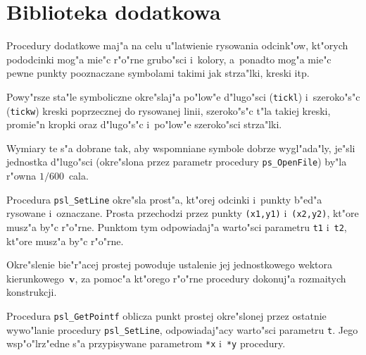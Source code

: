 \section{Biblioteka dodatkowa}

Procedury dodatkowe maj"a na celu u"latwienie rysowania odcink"ow, kt"orych
pod\-od\-cin\-ki mog"a mie"c r"o"rne grubo"sci i~kolory, a~ponadto mog"a mie"c
pewne punkty pooznaczane symbolami takimi jak strza"lki, kreski itp.

\vspace{\bigskipamount}
\begin{sloppypar}
Powy"rsze sta"le symboliczne okre"slaj"a po"low"e d"lugo"sci (\texttt{tickl})
i~szeroko"s"c (\texttt{tickw}) kreski poprzecznej do rysowanej linii,
szeroko"s"c t"la takiej kreski, promie"n kropki oraz d"lugo"s"c i~po"low"e
szeroko"sci strza"lki.
\end{sloppypar}

Wymiary te s"a dobrane tak, aby wspomniane symbole dobrze
wygl"ada"ly, je"sli jednostka d"lugo"sci (okre"slona przez parametr
procedury \texttt{ps\_OpenFile}) by"la r"owna $1/600$~cala.

\newpage
Procedura \texttt{psl\_SetLine} okre"sla prost"a, kt"orej odcinki i~punkty
b"ed"a rysowane i~oznaczane. Prosta przechodzi przez punkty \texttt{(x1,y1)}
i~\texttt{(x2,y2)}, kt"ore musz"a by"c r"o"rne. Punktom tym odpowiadaj"a
warto"sci parametru \texttt{t1} i~\texttt{t2}, kt"ore musz"a by"c r"o"rne.

Okre"slenie bie"r"acej prostej powoduje ustalenie jej jednostkowego wektora
kierunkowego~$\bm{v}$, za pomoc"a kt"orego r"o"rne procedury dokonuj"a
rozmaitych konstrukcji.

\vspace{\bigskipamount}
Procedura \texttt{psl\_GetPointf} oblicza punkt prostej okre"slonej przez
ostatnie wywo"lanie procedury \texttt{psl\_SetLine}, odpowiadaj"acy
warto"sci parametru \texttt{t}. Jego wsp"o"lrz"edne s"a przypisywane
parametrom \texttt{*x} i~\texttt{*y} procedury.

